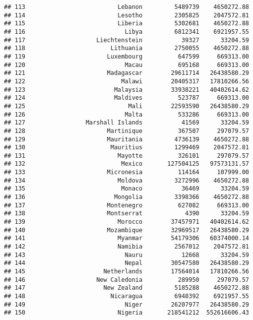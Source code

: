 \documentclass[
]{article}
\begin{document}
\begin{verbatim}
## 113                          Lebanon         5489739    4650272.88
## 114                          Lesotho         2305825    2047572.81
## 115                          Liberia         5302681    4650272.88
## 116                            Libya         6812341    6921957.55
## 117                    Liechtenstein           39327      33204.59
## 118                        Lithuania         2750055    4650272.88
## 119                       Luxembourg          647599     669313.00
## 120                            Macau          695168     669313.00
## 121                       Madagascar        29611714   26438580.29
## 122                           Malawi        20405317   17810266.56
## 123                         Malaysia        33938221   40402614.62
## 124                         Maldives          523787     669313.00
## 125                             Mali        22593590   26438580.29
## 126                            Malta          533286     669313.00
## 127                 Marshall Islands           41569      33204.59
## 128                       Martinique          367507     297079.57
## 129                       Mauritania         4736139    4650272.88
## 130                        Mauritius         1299469    2047572.81
## 131                          Mayotte          326101     297079.57
## 132                           Mexico       127504125   97573131.57
## 133                       Micronesia          114164     107999.00
## 134                          Moldova         3272996    4650272.88
## 135                           Monaco           36469      33204.59
## 136                         Mongolia         3398366    4650272.88
## 137                       Montenegro          627082     669313.00
## 138                       Montserrat            4390      33204.59
## 139                          Morocco        37457971   40402614.62
## 140                       Mozambique        32969517   26438580.29
## 141                          Myanmar        54179306   60374000.14
## 142                          Namibia         2567012    2047572.81
## 143                            Nauru           12668      33204.59
## 144                            Nepal        30547580   26438580.29
## 145                      Netherlands        17564014   17810266.56
## 146                    New Caledonia          289950     297079.57
## 147                      New Zealand         5185288    4650272.88
## 148                        Nicaragua         6948392    6921957.55
## 149                            Niger        26207977   26438580.29
## 150                          Nigeria       218541212  552616606.43

\end{verbatim}
\end{document}
